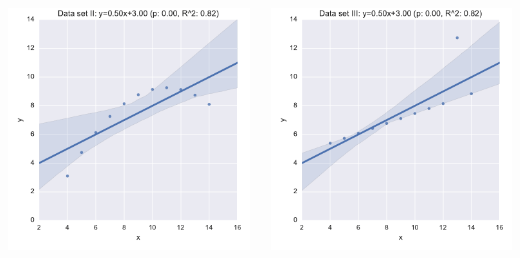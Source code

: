 \documentclass{beamer}
\begin{document}
\begin{frame}
\begin{columns}
\begin{column}{.5\textwidth}
\begin{center}
                \includegraphics[width=.8\textwidth]{./img/anscombe-II.pdf}
            \end{center}
        \end{column}
        \begin{column}{.5\textwidth}
            \begin{center}
                \includegraphics[width=.8\textwidth]{./img/anscombe-III.pdf}


\end{center}
\end{column}
\end{columns}
\end{frame}
\end{document}
